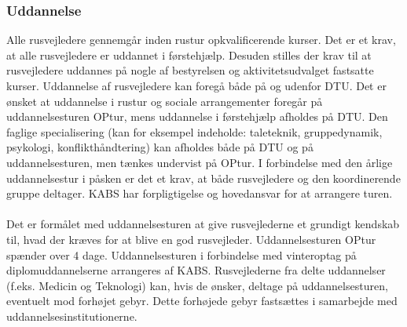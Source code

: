 \subsubsection{Uddannelse}
Alle rusvejledere gennemgår inden rustur opkvalificerende kurser. Det er et krav, at alle rusvejledere er uddannet i førstehjælp. Desuden stilles der krav til at rusvejledere uddannes på nogle af bestyrelsen og aktivitetsudvalget fastsatte kurser. Uddannelse af rusvejledere kan foregå både på og udenfor DTU. Det er ønsket at uddannelse i rustur og sociale arrangementer foregår på uddannelsesturen OPtur, mens uddannelse i førstehjælp afholdes på DTU. Den faglige specialisering (kan for eksempel indeholde: taleteknik, gruppedynamik, psykologi, konflikthåndtering) kan afholdes både på DTU og på uddannelsesturen, men tænkes undervist på OPtur. I forbindelse med den årlige uddannelsestur i påsken er det et krav, at både rusvejledere og den koordinerende gruppe deltager. KABS har forpligtigelse og hovedansvar for at arrangere turen.\\
\\
Det er formålet med uddannelsesturen at give rusvejlederne et grundigt kendskab til, hvad der kræves for at blive en god rusvejleder. Uddannelsesturen OPtur spænder over 4 dage. Uddannelsesturen i forbindelse med vinteroptag på diplomuddannelserne arrangeres af KABS. Rusvejlederne fra delte uddannelser (f.eks. Medicin og Teknologi) kan, hvis de ønsker, deltage på uddannelsesturen, eventuelt mod forhøjet gebyr. Dette forhøjede gebyr fastsættes i samarbejde med uddannelsesinstitutionerne.

